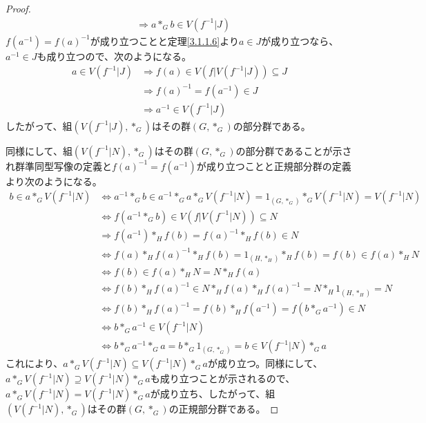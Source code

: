 \documentclass[dvipdfmx]{jsarticle}
\begin{document}
\begin{proof}
\begin{align*}
&\Rightarrow a*_{G}b \in V\left( f^{- 1}|J \right)
\end{align*}
$f\left( a^{- 1} \right) = {f(a)}^{- 1}$が成り立つことと定理\ref{3.1.1.6}より$a \in J$が成り立つなら、$a^{- 1} \in J$も成り立つので、次のようになる。
\begin{align*}
a \in V\left( f^{- 1}|J \right) &\Rightarrow f(a) \in V\left( f|V\left( f^{- 1}|J \right) \right) \subseteq J\\
&\Rightarrow {f(a)}^{- 1} = f\left( a^{- 1} \right) \in J\\
&\Rightarrow a^{- 1} \in V\left( f^{- 1}|J \right)
\end{align*}
したがって、組$\left( V\left( f^{- 1}|J \right),*_{G} \right)$はその群$\left( G,*_{G} \right)$の部分群である。\par
同様にして、組$\left( V\left( f^{- 1}|N \right),*_{G} \right)$はその群$\left( G,*_{G} \right)$の部分群であることが示され群準同型写像の定義と${f(a)}^{- 1} = f\left( a^{- 1} \right)$が成り立つことと正規部分群の定義より次のようになる。
\begin{align*}
b \in a*_{G}V\left( f^{- 1}|N \right) &\Leftrightarrow a^{- 1}*_{G}b \in a^{- 1}*_{G}a*_{G}V\left( f^{- 1}|N \right) = 1_{\left( G,*_{G} \right)}*_{G}V\left( f^{- 1}|N \right) = V\left( f^{- 1}|N \right)\\
&\Leftrightarrow f\left( a^{- 1}*_{G}b \right) \in V\left( f|V\left( f^{- 1}|N \right) \right) \subseteq N\\
&\Rightarrow f\left( a^{- 1} \right)*_{H}f(b) = {f(a)}^{- 1}*_{H}f(b) \in N\\
&\Leftrightarrow f(a)*_{H}{f(a)}^{- 1}*_{H}f(b) = 1_{\left( H,*_{H} \right)}*_{H}f(b) = f(b) \in f(a)*_{H}N\\
&\Leftrightarrow f(b) \in f(a)*_{H}N = N*_{H}f(a)\\
&\Leftrightarrow f(b)*_{H}{f(a)}^{- 1} \in N*_{H}f(a)*_{H}{f(a)}^{- 1} = N*_{H}1_{\left( H,*_{H} \right)} = N\\
&\Leftrightarrow f(b)*_{H}{f(a)}^{- 1} = f(b)*_{H}f\left( a^{- 1} \right) = f\left( b*_{G}a^{- 1} \right) \in N\\
&\Leftrightarrow b*_{G}a^{- 1} \in V\left( f^{- 1}|N \right)\\
&\Leftrightarrow b*_{G}a^{- 1}*_{G}a = b*_{G}1_{\left( G,*_{G} \right)} = b \in V\left( f^{- 1}|N \right)*_{G}a
\end{align*}
これにより、$a*_{G}V\left( f^{- 1}|N \right) \subseteq V\left( f^{- 1}|N \right)*_{G}a$が成り立つ。同様にして、$a*_{G}V\left( f^{- 1}|N \right) \supseteq V\left( f^{- 1}|N \right)*_{G}a$も成り立つことが示されるので、$a*_{G}V\left( f^{- 1}|N \right) = V\left( f^{- 1}|N \right)*_{G}a$が成り立ち、したがって、組$\left( V\left( f^{- 1}|N \right),*_{G} \right)$はその群$\left( G,*_{G} \right)$の正規部分群である。
\end{proof}
\end{document}
